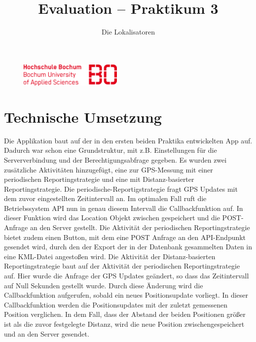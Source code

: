 

\title{Evaluation -- Praktikum 3}
\author{Die Lokalisatoren}

\ihead{}
\chead{}
\ohead{}
\ifoot{}
\cfoot{\pagemark}
\ofoot{}



\setlength{\parskip}{0em}
\setlength{\parindent}{0em}
\renewcommand{\baselinestretch}{1.5}



\begin{figure}[t]
	\flushright
	\includegraphics[width=5cm]{hs-bo-logo}
\end{figure}

\docheader

\section{Technische Umsetzung}
Die Applikation baut auf der in den ersten beiden Praktika entwickelten App auf. Dadurch war schon eine Grundstruktur, mit z.B. Einstellungen für die Serververbindung und der Berechtigungsabfrage gegeben.
Es wurden zwei zusätzliche Aktivitäten hinzugefügt, eine zur GPS-Messung mit einer periodischen Reportingstrategie und eine mit Distanz-basierter Reportingstrategie.
Die periodische-Reportigstrategie fragt GPS Updates mit dem zuvor eingestellten Zeitintervall an. Im optimalen Fall ruft die Betriebssystem API nun in genau diesem Intervall die Callbackfunktion auf. In dieser Funktion wird das Location Objekt zwischen gespeichert und die POST-Anfrage an den Server gestellt. Die Aktivität der periodischen Reportingstrategie bietet zudem einen Button, mit dem eine POST Anfrage an den API-Endpunkt gesendet wird, durch den der Export der in der Datenbank gesammelten Daten in eine KML-Datei angestoßen wird.
Die Aktivität der  Distanz-basierten Reportingstrategie baut auf der Aktivität der periodischen Reportingstrategie auf. Hier wurde die Anfrage der GPS Updates geändert, so dass das Zeitintervall auf Null Sekunden gestellt wurde. Durch diese Änderung wird die Callbackfunktion aufgerufen, sobald ein neues Positionsupdate vorliegt. In dieser Callbackfunktion werden die Positionsupdates mit der zuletzt gemessenen Position verglichen. In dem Fall, dass der Abstand der beiden Positionen größer ist als die zuvor festgelegte Distanz, wird die neue Position zwischengespeichert und an den Server gesendet.

